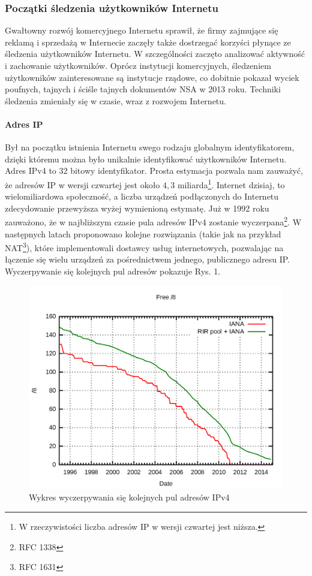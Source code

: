 \subsubsection{Początki śledzenia użytkowników Internetu}
Gwałtowny rozwój komercyjnego Internetu sprawił, że firmy zajmujące się reklamą
i sprzedażą w Internecie zaczęły także dostrzegać korzyści płynące ze śledzenia
użytkowników Internetu. W szczególności zaczęto analizować aktywność i
zachowanie użytkowników. Oprócz instytucji komercyjnych, śledzeniem użytkowników
zainteresowane są instytucje rządowe, co dobitnie pokazał wyciek poufnych,
tajnych i ściśle tajnych dokumentów NSA w 2013 roku. Techniki śledzenia
zmieniały się w czasie, wraz z rozwojem Internetu.

\paragraph{Adres IP}
Był na początku istnienia Internetu swego rodzaju globalnym identyfikatorem,
dzięki któremu można było unikalnie identyfikować użytkowników Internetu. Adres
IPv4 to \(32\) bitowy identyfikator. Prosta estymacja pozwala nam zauważyć, że
adresów IP w wersji czwartej jest około \(4,3\) miliarda\footnote{W
rzeczywistości liczba adresów IP w wersji czwartej jest niższa.}. Internet
dzisiaj, to wielomiliardowa społeczność, a liczba urządzeń podłączonych do
Internetu zdecydowanie przewyższa wyżej wymienioną estymatę. Już w 1992 roku
zauważono, że w najbliższym czasie pula adresów IPv4 zostanie
wyczerpana\footnote{RFC 1338}. W następnych latach proponowano kolejne
rozwiązania (takie jak na przykład NAT\footnote{RFC 1631}), które implementowali
dostawcy usług internetowych, pozwalając na łączenie się wielu urządzeń za
pośrednictwem jednego, publicznego adresu IP. Wyczerpywanie się kolejnych pul
adresów pokazuje Rys. 1.

\begin{figure}
	\includegraphics[width=\textwidth,keepaspectratio]{img/01}
	\caption{Wykres wyczerpywania się kolejnych pul adresów IPv4}
\end{figure}

